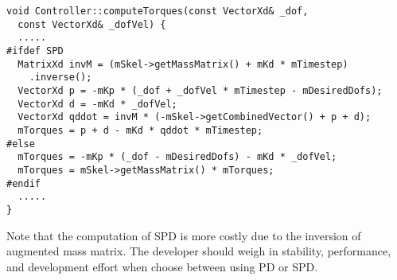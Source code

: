 \ttfamily
\begin{lstlisting}[caption=Controller.cpp]
void Controller::computeTorques(const VectorXd& _dof,
  const VectorXd& _dofVel) {
  .....
#ifdef SPD
  MatrixXd invM = (mSkel->getMassMatrix() + mKd * mTimestep)
    .inverse();
  VectorXd p = -mKp * (_dof + _dofVel * mTimestep - mDesiredDofs);
  VectorXd d = -mKd * _dofVel;
  VectorXd qddot = invM * (-mSkel->getCombinedVector() + p + d);
  mTorques = p + d - mKd * qddot * mTimestep;
#else
  mTorques = -mKp * (_dof - mDesiredDofs) - mKd * _dofVel;
  mTorques = mSkel->getMassMatrix() * mTorques;
#endif
  .....
}
\end{lstlisting}
\rmfamily

Note that the computation of SPD is more costly due to the inversion
of augmented mass matrix. The developer should weigh in stability,
performance, and development effort when choose between using PD or
SPD.
